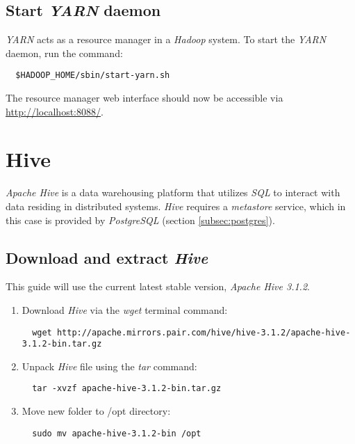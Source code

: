 \documentclass{article}
\begin{document}
  \subsection{Start \emph{YARN} daemon}
  \emph{YARN} acts as a resource manager in a \emph{Hadoop} system. To start the \emph{YARN}
  daemon, run the command:
  \begin{verbatim}
  $HADOOP_HOME/sbin/start-yarn.sh
  \end{verbatim}
  The resource manager web interface should now be accessible via
  \url{http://localhost:8088/}.

\newpage
\section{Hive}
\emph{Apache Hive} is a data warehousing platform that utilizes \emph{SQL} to interact with
data residing in distributed systems. \emph{Hive} requires a \emph{metastore} service, which in
this case is provided by \emph{PostgreSQL} (section \ref{subsec:postgres}).

  \subsection{Download and extract \emph{Hive}}
  This guide will use the current latest stable version, \emph{Apache Hive 3.1.2}.
  \begin{enumerate}
  \item Download \emph{Hive} via the \emph{wget} terminal command:
  \begin{verbatim}
  wget http://apache.mirrors.pair.com/hive/hive-3.1.2/apache-hive-3.1.2-bin.tar.gz
  \end{verbatim}

  \item Unpack \emph{Hive} file using the \emph{tar} command:
  \begin{verbatim}
  tar -xvzf apache-hive-3.1.2-bin.tar.gz
  \end{verbatim}

  \item Move new folder to /opt directory:
  \begin{verbatim}
  sudo mv apache-hive-3.1.2-bin /opt
  \end{verbatim}
  \end{enumerate}
\end{document}
